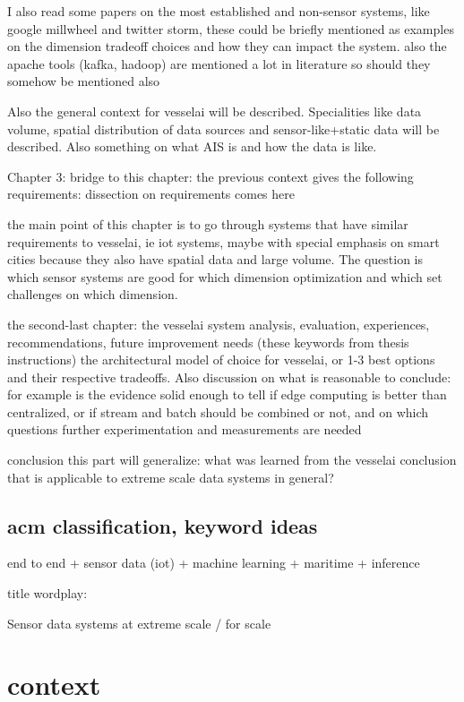 I also read some papers on the most established and non-sensor systems, like google millwheel and twitter storm, these could be briefly mentioned as examples on the dimension tradeoff choices and how they can impact the system. also the apache tools (kafka, hadoop) are mentioned a lot in literature so should they somehow be mentioned also

Also the general context for vesselai will be described. Specialities like data volume, spatial distribution of data sources and sensor-like+static data will be described. Also something on what AIS is and how the data is like. 

Chapter 3: bridge to this chapter: the previous context gives the following requirements: dissection on requirements comes here

the main point of this chapter is to go through systems that have similar requirements to vesselai, ie iot systems, maybe with special emphasis on smart cities because they also have spatial data and large volume. The question is which sensor systems are good for which dimension optimization and which set challenges on which dimension.

the second-last chapter:  the vesselai system
analysis, evaluation, experiences, recommendations, future improvement needs (these keywords from thesis instructions)
the architectural model of choice for vesselai, or 1-3 best options and their respective tradeoffs. Also discussion on what is reasonable to conclude: for example is the evidence solid enough to tell if edge computing is better than centralized, or
if stream and batch should be combined or not, and on which questions further experimentation and measurements are needed

conclusion
this part will generalize: what was learned from the vesselai conclusion that is applicable to extreme scale data systems in general?

\section{acm classification,  keyword ideas}

end to end + sensor data (iot) + machine learning + maritime + inference

title wordplay:

Sensor data systems at extreme scale / for scale

\chapter{context}

